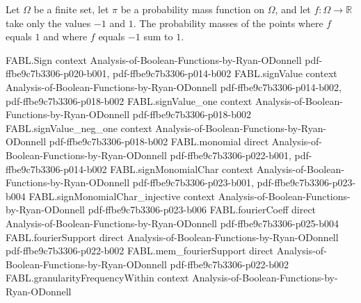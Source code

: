 \begin{theorem}
\label{FABL.pmfSignPlusMass_add_minus}
\leanok
{}
Let $\Omega$ be a finite set, let $\pi$ be a probability mass function on $\Omega$, and
let $f:\Omega\to\mathbb{R}$ take only the values $-1$ and $1$. The probability masses of
the points where $f$ equals $1$ and where $f$ equals $-1$ sum to $1$.
\end{theorem}

\begin{theorem}
\label{FABL.pmfExpectation_eq_signPlusMass_sub_minus}
\leanok
{}
\proofstep
  {FABL.Sign}
  {context}
  {Analysis-of-Boolean-Functions-by-Ryan-ODonnell}
  {pdf-ffbe9c7b3306-p020-b001,
    pdf-ffbe9c7b3306-p014-b002}
\proofstep
  {FABL.signValue}
  {context}
  {Analysis-of-Boolean-Functions-by-Ryan-ODonnell}
  {pdf-ffbe9c7b3306-p014-b002,
    pdf-ffbe9c7b3306-p018-b002}
\proofstep
  {FABL.signValue_one}
  {context}
  {Analysis-of-Boolean-Functions-by-Ryan-ODonnell}
  {pdf-ffbe9c7b3306-p018-b002}
\proofstep
  {FABL.signValue_neg_one}
  {context}
  {Analysis-of-Boolean-Functions-by-Ryan-ODonnell}
  {pdf-ffbe9c7b3306-p018-b002}
\proofstep
  {FABL.monomial}
  {direct}
  {Analysis-of-Boolean-Functions-by-Ryan-ODonnell}
  {pdf-ffbe9c7b3306-p022-b001,
    pdf-ffbe9c7b3306-p014-b002}
\proofstep
  {FABL.signMonomialChar}
  {context}
  {Analysis-of-Boolean-Functions-by-Ryan-ODonnell}
  {pdf-ffbe9c7b3306-p023-b001,
    pdf-ffbe9c7b3306-p023-b004}
\proofstep
  {FABL.signMonomialChar_injective}
  {context}
  {Analysis-of-Boolean-Functions-by-Ryan-ODonnell}
  {pdf-ffbe9c7b3306-p023-b006}
\proofstep
  {FABL.fourierCoeff}
  {direct}
  {Analysis-of-Boolean-Functions-by-Ryan-ODonnell}
  {pdf-ffbe9c7b3306-p025-b004}
\proofstep
  {FABL.fourierSupport}
  {direct}
  {Analysis-of-Boolean-Functions-by-Ryan-ODonnell}
  {pdf-ffbe9c7b3306-p022-b002}
\proofstep
  {FABL.mem_fourierSupport}
  {direct}
  {Analysis-of-Boolean-Functions-by-Ryan-ODonnell}
  {pdf-ffbe9c7b3306-p022-b002}
\proofstep
  {FABL.granularityFrequencyWithin}
  {context}
  {Analysis-of-Boolean-Functions-by-Ryan-ODonnell}

\end{theorem}
